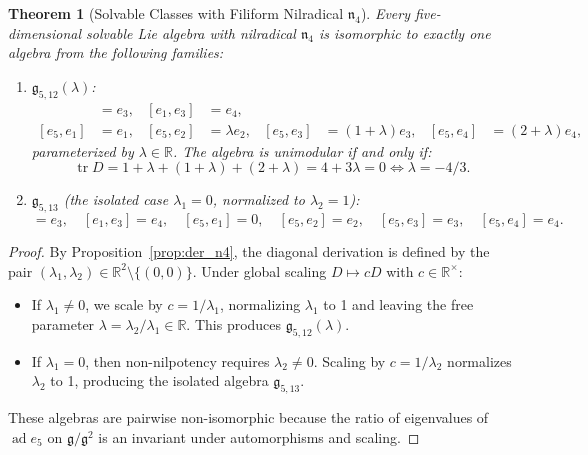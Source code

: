 \documentclass[11pt,a4paper]{article}
\newtheorem{theorem}{Theorem}[section]
\theoremstyle{definition}
\theoremstyle{remark}
\newcommand{\R}{\mathbb{R}}
\newcommand{\g}{\mathfrak{g}}
\newcommand{\ad}{\operatorname{ad}}
\newcommand{\tr}{\operatorname{tr}}
\begin{document}
\begin{theorem}[Solvable Classes with Filiform Nilradical $\mathfrak{n}_4$]\label{thm:n4_solv}
Every five-dimensional solvable Lie algebra with nilradical $\mathfrak{n}_4$ is isomorphic to exactly one algebra from the following families:
\begin{enumerate}
    \item $\g_{5,12}(\lambda)$:
    \begin{align}
        [e_1, e_2] &= e_3, & [e_1, e_3] &= e_4, \nonumber \\
        [e_5, e_1] &= e_1, & [e_5, e_2] &= \lambda e_2, & [e_5, e_3] &= (1+\lambda)e_3, & [e_5, e_4] &= (2+\lambda)e_4,
    \end{align}
    parameterized by $\lambda \in \R$. The algebra is unimodular if and only if:
    \begin{equation}
        \tr D = 1 + \lambda + (1+\lambda) + (2+\lambda) = 4 + 3\lambda = 0 \iff \lambda = -4/3.
    \end{equation}
    \item $\g_{5,13}$ (the isolated case $\lambda_1 = 0$, normalized to $\lambda_2 = 1$):
    \begin{equation}
        [e_1, e_2] = e_3, \quad [e_1, e_3] = e_4, \quad [e_5, e_1] = 0, \quad [e_5, e_2] = e_2, \quad [e_5, e_3] = e_3, \quad [e_5, e_4] = e_4.
    \end{equation}
\end{enumerate}
\end{theorem}

\begin{proof}
By Proposition~\ref{prop:der_n4}, the diagonal derivation is defined by the pair $(\lambda_1, \lambda_2) \in \R^2 \setminus \{(0,0)\}$. Under global scaling $D \mapsto c D$ with $c \in \R^\times$:
\begin{itemize}
    \item If $\lambda_1 \neq 0$, we scale by $c = 1/\lambda_1$, normalizing $\lambda_1$ to 1 and leaving the free parameter $\lambda = \lambda_2 / \lambda_1 \in \R$. This produces $\g_{5,12}(\lambda)$.
    \item If $\lambda_1 = 0$, then non-nilpotency requires $\lambda_2 \neq 0$. Scaling by $c = 1/\lambda_2$ normalizes $\lambda_2$ to 1, producing the isolated algebra $\g_{5,13}$.
\end{itemize}
These algebras are pairwise non-isomorphic because the ratio of eigenvalues of $\ad e_5$ on $\g/\g^2$ is an invariant under automorphisms and scaling.
\end{proof}
\end{document}
